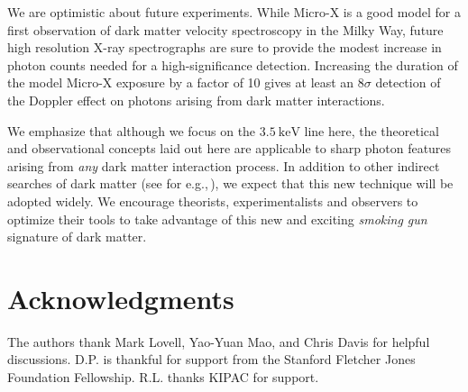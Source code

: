 \documentclass[aps,prd,10pt,twocolumn,superscriptaddress,showpacs]{revtex4-1}
\newcommand{\units}[1]{~\mathrm{#1}}
\begin{document}
We are optimistic about future experiments. While Micro-X is a good model for a first observation of dark matter velocity
spectroscopy in the Milky Way, future high resolution X-ray spectrographs are sure to provide the
modest increase in photon counts needed for a high-significance detection. Increasing the duration
of the model Micro-X exposure by a factor of 10 gives at least an $8\sigma$ detection of the Doppler
effect on photons arising from dark matter interactions.

We emphasize that although we focus on the $3.5\units{keV}$ line here, the theoretical and
observational concepts laid out here are applicable to sharp photon features arising from \emph{any} dark matter
interaction process.  In addition to other indirect searches of dark matter (see for e.g.,\,\cite{Dasgupta:2012bd,Laha:2012fg,Ng:2013xha,Murase:2015gea,Chowdhury:2016bxs}), we expect that this new technique will be adopted widely.  We encourage theorists, experimentalists and observers to optimize their tools to take advantage of this new and exciting {\it smoking gun} signature of dark matter.  

 
	

\section*{Acknowledgments} 

The authors thank Mark Lovell, Yao-Yuan Mao, and Chris Davis for helpful discussions. D.P. is
thankful for support from the Stanford Fletcher Jones Foundation Fellowship.  R.L. thanks KIPAC for support.


\newcommand{\mnras}[0]{M.N.R.A.S.}
%
%	
	
\end{document}
